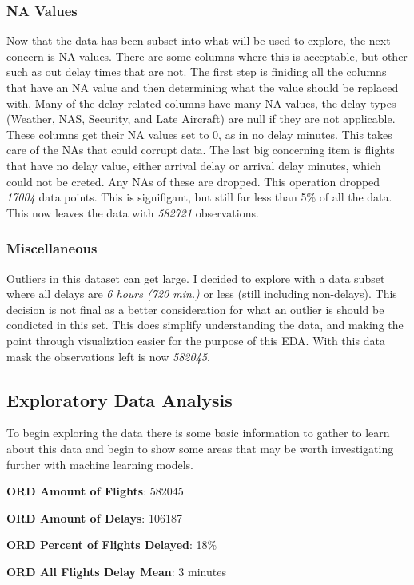 \documentclass[a4paper,12pt]{article}
\begin{document}
\subsubsection{NA Values}
Now that the data has been subset into what will be used to explore, the next concern is NA values. There are some columns where this is acceptable, but other such as out delay times
that are not. The first step is finiding all the columns that have an NA value and then determining what the value should be replaced with. Many of the delay related columns have many NA values,
the delay types (Weather, NAS, Security, and Late Aircraft) are null if they are not applicable. These columns get their NA values set to 0, as in no delay minutes. This takes care of the NAs that could corrupt data.
The last big concerning item is flights that have no delay value, either arrival delay or arrival delay minutes, which could not be creted. Any NAs of these are dropped.
This operation dropped \emph{17004} data points. This is signifigant, but still far less than 5\% of all the data. This now leaves the data with \emph{582721} observations.

\subsubsection{Miscellaneous}
Outliers in this dataset can get large. I decided to explore with a data subset where all delays are \emph{6 hours (720 min.)} or less (still including non-delays). This decision is not final as a better
consideration for what an outlier is should be condicted in this set. This does simplify understanding the data, and making the point through visualiztion easier for the purpose of this EDA.
With this data mask the observations left is now \emph{582045}.

\subsection{Exploratory Data Analysis}

To begin exploring the data there is some basic information to gather to learn about this data and begin to show some areas that may be worth investigating further with machine learning models.

\textbf{ORD Amount of Flights}: 582045

\textbf{ORD Amount of Delays}: 106187

\textbf{ORD Percent of Flights Delayed}: 18\%

\textbf{ORD All Flights Delay Mean}: 3 minutes
\end{document}
